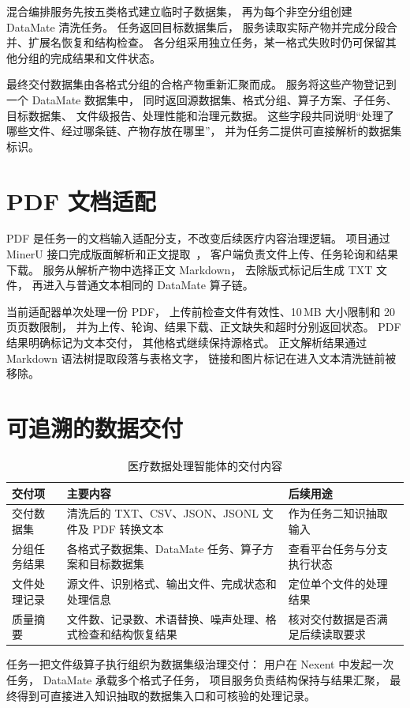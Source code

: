 混合编排服务先按五类格式建立临时子数据集，
再为每个非空分组创建 DataMate 清洗任务。
任务返回目标数据集后，
服务读取实际产物并完成分段合并、扩展名恢复和结构检查。
各分组采用独立任务，某一格式失败时仍可保留其他分组的完成结果和文件状态。

最终交付数据集由各格式分组的合格产物重新汇聚而成。
服务将这些产物登记到一个 DataMate 数据集中，
同时返回源数据集、格式分组、算子方案、子任务、目标数据集、
文件级报告、处理性能和治理元数据。
这些字段共同说明“处理了哪些文件、经过哪条链、产物存放在哪里”，
并为任务二提供可直接解析的数据集标识。

\section{PDF 文档适配}

PDF 是任务一的文档输入适配分支，不改变后续医疗内容治理逻辑。
项目通过 MinerU 接口完成版面解析和正文提取~\cite{mineru2024,minerurepo}，
客户端负责文件上传、任务轮询和结果下载。
服务从解析产物中选择正文 Markdown，
去除版式标记后生成 TXT 文件，
再进入与普通文本相同的 DataMate 算子链。

当前适配器单次处理一份 PDF，
上传前检查文件有效性、10\,MB 大小限制和 20 页页数限制，
并为上传、轮询、结果下载、正文缺失和超时分别返回状态。
PDF 结果明确标记为文本交付，
其他格式继续保持源格式。
正文解析结果通过 Markdown 语法树提取段落与表格文字，
链接和图片标记在进入文本清洗链前被移除。

\section{可追溯的数据交付}

\begin{table}[H]
\centering
\caption{医疗数据处理智能体的交付内容}
\label{tab:task1-delivery}
\begin{tabularx}{\textwidth}{L{3.2cm}L{4.3cm}Y}
\toprule
\textbf{交付项} & \textbf{主要内容} & \textbf{后续用途} \\
\midrule
交付数据集 &
清洗后的 TXT、CSV、JSON、JSONL 文件及 PDF 转换文本 &
作为任务二知识抽取输入 \\
\addlinespace
分组任务结果 &
各格式子数据集、DataMate 任务、算子方案和目标数据集 &
查看平台任务与分支执行状态 \\
\addlinespace
文件处理记录 &
源文件、识别格式、输出文件、完成状态和处理信息 &
定位单个文件的处理结果 \\
\addlinespace
质量摘要 &
文件数、记录数、术语替换、噪声处理、格式检查和结构恢复结果 &
核对交付数据是否满足后续读取要求 \\
\bottomrule
\end{tabularx}
\end{table}

任务一把文件级算子执行组织为数据集级治理交付：
用户在 Nexent 中发起一次任务，
DataMate 承载多个格式子任务，
项目服务负责结构保持与结果汇聚，
最终得到可直接进入知识抽取的数据集入口和可核验的处理记录。
